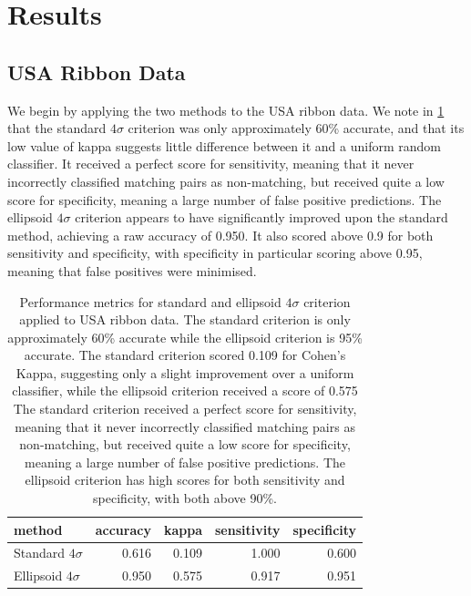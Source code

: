 \documentclass[a4paper]{article}
\begin{document}
\section{Results}


\subsection{USA Ribbon Data}

We begin by applying the two methods to the USA ribbon data. We note in \cref{tab:std_metrics_usa} that the standard $4\sigma$ criterion was only approximately 60\% accurate, and that its low value of kappa suggests little difference between it and a uniform random classifier. It received a perfect score for sensitivity, meaning that it never incorrectly classified matching pairs as non-matching, but received quite a low score for specificity, meaning a large number of false positive predictions. The ellipsoid $4\sigma$ criterion appears to have significantly improved upon the standard method, achieving a raw accuracy of 0.950. It also scored above 0.9 for both sensitivity and specificity, with specificity in particular scoring above 0.95, meaning that false positives were minimised.

\begin{table}[h]
	\centering
    \begin{tabular}{lrrrr}
        \hline
		method       & accuracy  & kappa      & sensitivity & specificity \\ \hline
        Standard $4\sigma$ & 0.616 & 0.109 & 1.000 & 0.600\\
		Ellipsoid $4\sigma$  & 0.950 & 0.575 & 0.917 & 0.951\\ \hline
	\end{tabular}
	\caption{Performance metrics for standard and ellipsoid $4\sigma$ criterion applied to USA ribbon data. The standard criterion is only approximately 60\% accurate while the ellipsoid criterion is 95\% accurate. The standard criterion scored 0.109 for Cohen's Kappa, suggesting only a slight improvement over a uniform classifier, while the ellipsoid criterion received a score of 0.575 The standard criterion received a perfect score for sensitivity, meaning that it never incorrectly classified matching pairs as non-matching, but received quite a low score for specificity, meaning a large number of false positive predictions. The ellipsoid criterion has high scores for both sensitivity and specificity, with both above 90\%.}
	\label{tab:std_metrics_usa}
\end{table}
\end{document}
